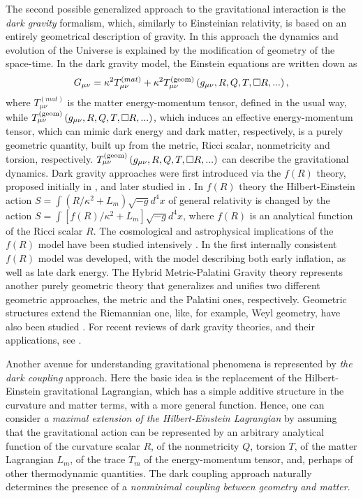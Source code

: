 \documentclass[aps,superscriptaddress, showpacs,preprintnumbers, superscriptaddress, nofootinbibt,twocolumn]{revtex4}
\def\be{\begin{equation}}
\def\ee{\end{equation}}
\begin{document}
The second possible generalized approach to the gravitational interaction is the {\it dark gravity} formalism, which, similarly to Einsteinian relativity, is based on an entirely geometrical description of gravity. In this approach the dynamics and evolution of the Universe is explained by the modification of geometry of the space-time. In the dark gravity model, the Einstein equations are written down as
\be
G_{\mu \nu}=\kappa ^2T_{\mu \nu}^{(mat)}+\kappa ^2 T_{\mu \nu}^{(\rm geom)}\left(g_{\mu \nu}, R, Q, T, \square R,...\right),
\ee
 where $T_{\mu \nu}^{(mat)}$ is the matter energy-momentum tensor, defined in the usual way,  while $T_{\mu \nu}^{(\rm geom)}\left(g_{\mu \nu}, R, Q,T, \square R,...\right)$, which induces an effective energy-momentum tensor, which can mimic dark energy and dark matter, respectively, is a purely geometric quantity, built up from the metric, Ricci scalar, nonmetricity and torsion, respectively.  $T_{\mu \nu}^{(\rm geom)}\left(g_{\mu \nu}, R, Q, T, \square R,...\right)$ can describe the gravitational dynamics. Dark gravity approaches were first introduced via the $f(R)$ theory, proposed initially in \cite{Bu1}, and later studied in \cite{Bu2,Bu3,Bu4,Bu5}. In $f(R)$ theory the Hilbert-Einstein action $S=\int{\left(R/\kappa ^2+L_m\right)\sqrt{-g}d^4x}$ of general relativity is changed by the action  $S= \int{\left[f(R)/\kappa^2+L_m\right]\sqrt{-g}d^4x}$, where $f(R)$ is an analytical function of the Ricci scalar $R$. The cosmological and astrophysical implications of the $f(R)$ model have been studied intensively  \cite{fR1,fRn1,fRn2,fRn3,fR2,fR3,fR4,fR5,fR6,fRn4, fR7,fR8,fR9,fR10,fR11}. In \cite{fRn4} the first internally consistent $f(R)$ model was developed, with the model describing both early inflation, as well as late dark energy. The Hybrid Metric-Palatini Gravity theory \cite{HMP1,HMP2,HMP3,HMP4} represents another purely geometric theory that generalizes and unifies two different geometric approaches, the metric and the Palatini ones, respectively. Geometric structures extend the Riemannian one, like, for example, Weyl geometry, have also been studied \cite{W1,W2,W3,W4,W5,W6,W7,W8,W9,W10,weylcartan}. For recent reviews of dark gravity theories, and their applications, see \cite{R1,R2,R3,R4, R5}.

Another avenue for understanding gravitational phenomena is represented by {\it the dark coupling} approach.  Here the basic idea is the replacement of the Hilbert-Einstein gravitational Lagrangian, which has a simple additive structure in the curvature and matter terms,  with a more general function. Hence, one can consider {\it a maximal extension of the Hilbert-Einstein Lagrangian} by assuming that the gravitational action can be represented by an arbitrary analytical function of the curvature scalar $R$, of the nonmetricity $Q$, torsion $T$, of the matter Lagrangian $L_m$, of the trace $T_m$ of the energy-momentum tensor, and, perhaps of other thermodynamic quantities. The dark coupling approach naturally determines the presence of a {\it nonminimal coupling between geometry and matter}.
\end{document}
